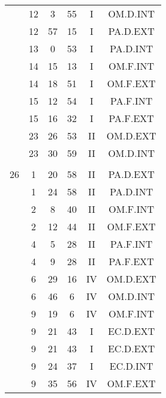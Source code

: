 \documentclass[12pt, a4paper]{article}
\begin{document}
\begin{multicols}{3}
{\begin{tabular}{c c c c c c}
	 	 	 	 & 12 & 3 & 55 & I & OM.D.INT\\%
	 	 	 	 & 12 & 57 & 15 & I & PA.D.EXT\\%
	 	 	 	 & 13 & 0 & 53 & I & PA.D.INT\\%
	 	 	 	 & 14 & 15 & 13 & I & OM.F.INT\\%
	 	 	 	 & 14 & 18 & 51 & I & OM.F.EXT\\%
	 	 	 	 & 15 & 12 & 54 & I & PA.F.INT\\%
	 	 	 	 & 15 & 16 & 32 & I & PA.F.EXT\\%
	 	 	 	 & 23 & 26 & 53 & II & OM.D.EXT\\%
	 	 	 	 & 23 & 30 & 59 & II & OM.D.INT\\%
	 	 	 	 & & & & & \\%
	 	 	 	26 & 1 & 20 & 58 & II & PA.D.EXT\\%
	 	 	 	 & 1 & 24 & 58 & II & PA.D.INT\\%
	 	 	 	 & 2 & 8 & 40 & II & OM.F.INT\\%
	 	 	 	 & 2 & 12 & 44 & II & OM.F.EXT\\%
	 	 	 	 & 4 & 5 & 28 & II & PA.F.INT\\%
	 	 	 	 & 4 & 9 & 28 & II & PA.F.EXT\\%
	 	 	 	 & 6 & 29 & 16 & IV & OM.D.EXT\\%
	 	 	 	 & 6 & 46 & 6 & IV & OM.D.INT\\%
	 	 	 	 & 9 & 19 & 6 & IV & OM.F.INT\\%
	 	 	 	 & 9 & 21 & 43 & I & EC.D.EXT\\%
	 	 	 	 & 9 & 21 & 43 & I & EC.D.EXT\\%
	 	 	 	 & 9 & 24 & 37 & I & EC.D.INT\\%
	 	 	 	 & 9 & 35 & 56 & IV & OM.F.EXT\\%

\end{tabular}}
\end{multicols}
\end{document}
